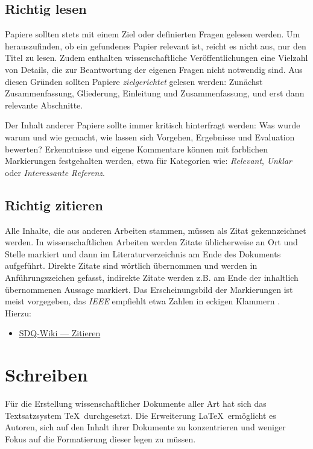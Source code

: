 \subsection{Richtig lesen}%
\label{sec:Recherchieren:Lesen}

Papiere sollten stets mit einem Ziel oder definierten Fragen gelesen werden.
Um herauszufinden, ob ein gefundenes Papier relevant ist, reicht es nicht aus, nur den Titel zu lesen.
Zudem enthalten wissenschaftliche Veröffentlichungen eine Vielzahl von Details, die zur Beantwortung der eigenen Fragen nicht notwendig sind.
Aus diesen Gründen sollten Papiere \emph{zielgerichtet} gelesen werden: Zunächst Zusammenfassung, Gliederung, Einleitung und Zusammenfassung, und erst dann relevante Abschnitte.

Der Inhalt anderer Papiere sollte immer kritisch hinterfragt werden: Was wurde warum und wie gemacht, wie lassen sich Vorgehen, Ergebnisse und Evaluation bewerten?
Erkenntnisse und eigene Kommentare können mit farblichen Markierungen festgehalten werden, etwa für Kategorien wie: \emph{Relevant}, \emph{Unklar} oder \emph{Interessante Referenz}.

\subsection{Richtig zitieren}%
\label{sec:Recherchieren:Zitieren}

Alle Inhalte, die aus anderen Arbeiten stammen, müssen als Zitat gekennzeichnet werden.
In wissenschaftlichen Arbeiten werden Zitate üblicherweise an Ort und Stelle markiert und dann im Literaturverzeichnis am Ende des Dokuments aufgeführt.
Direkte Zitate sind wörtlich übernommen und werden in Anführungszeichen gefasst, indirekte Zitate werden z.B. am Ende der inhaltlich übernommenen Aussage markiert.
Das Erscheinungsbild der Markierungen ist meist vorgegeben, das \emph{IEEE} empfiehlt etwa Zahlen in eckigen Klammern \cite{IEEE2021}.
Hierzu:

\smallskip
\begin{itemize}[label={\symbolInfo}]
    \item \href{https://sdqweb.ipd.kit.edu/wiki/Zitieren}{SDQ-Wiki --- Zitieren}
\end{itemize}


\section{Schreiben}%
\label{sec:Schreiben}

Für die Erstellung wissenschaftlicher Dokumente aller Art hat sich das Textsatzsystem \TeX\ durchgesetzt.
Die Erweiterung \LaTeX\ ermöglicht es Autoren, sich auf den Inhalt ihrer Dokumente zu konzentrieren und weniger Fokus auf die Formatierung dieser legen zu müssen.

